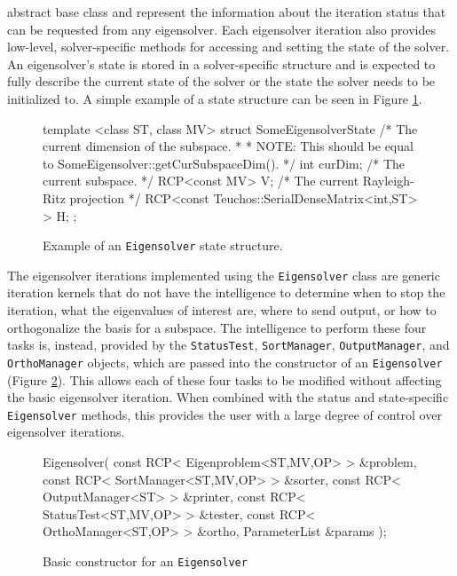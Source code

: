 \documentclass[acmtoms]{acmtrans2m}
\newcommand{\aspace}[1]{\texttt{#1}}
\begin{document}
abstract base class and represent the information about the iteration status that can 
be requested from any eigensolver.  Each eigensolver iteration also provides low-level, 
solver-specific methods for accessing and setting the state of the solver.  
An eigensolver's state is stored in a solver-specific structure and is expected to fully describe 
the current state of the solver or the state the solver needs to be initialized to.  
A simple example of a state structure can be seen in Figure \ref{fig:state}.
\begin{figure}[htb]
\begin{center}
\begin{boxedverbatim}
  template <class ST, class MV>
  struct SomeEigensolverState {
    /* The current dimension of the subspace.                              *
     * NOTE: This should be equal to SomeEigensolver::getCurSubspaceDim(). */
    int curDim;
    /* The current subspace. */
    RCP<const MV> V;
    /* The current Rayleigh-Ritz projection */
    RCP<const Teuchos::SerialDenseMatrix<int,ST> > H;
  };
\end{boxedverbatim}
\end{center}
\caption{Example of an \aspace{Eigensolver} state structure.}
\label{fig:state}
\end{figure}

The eigensolver iterations implemented using the \aspace{Eigensolver} class
are generic iteration kernels that do not have the intelligence to determine when
to stop the iteration, what the eigenvalues of interest are, where to send output,
or how to orthogonalize the basis for a subspace.  The intelligence to perform these four
tasks is, instead, provided by the \aspace{StatusTest}, \aspace{SortManager},
\aspace{OutputManager}, and \aspace{OrthoManager} objects, which are passed into the
constructor of an \aspace{Eigensolver} (Figure \ref{fig:constructor}).  This allows 
each of these four tasks to be modified without affecting the basic eigensolver 
iteration. When combined with the status and state-specific \aspace{Eigensolver} 
methods, this provides the user with a large degree of control over eigensolver iterations.
\begin{figure}[htb]
\begin{center}
\begin{boxedverbatim}
Eigensolver(
   const RCP< Eigenproblem<ST,MV,OP> > &problem,
   const RCP< SortManager<ST,MV,OP>  > &sorter,
   const RCP< OutputManager<ST>      > &printer,
   const RCP< StatusTest<ST,MV,OP>   > &tester,
   const RCP< OrthoManager<ST,OP>    > &ortho,
   ParameterList                       &params
 );
\end{boxedverbatim}
\end{center}
\caption{Basic constructor for an \aspace{Eigensolver}}
\label{fig:constructor}
\end{figure}
\end{document}
